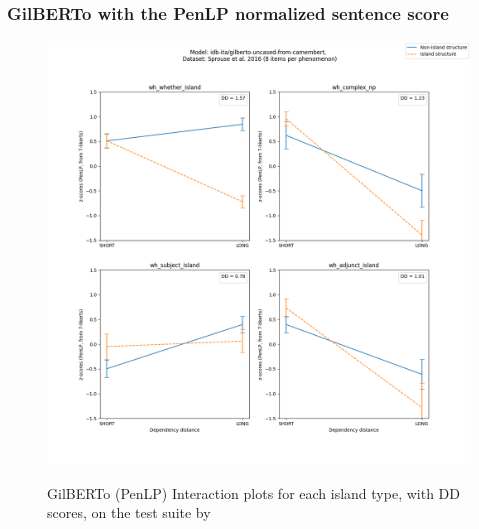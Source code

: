 \subsubsection{GilBERTo with the PenLP normalized sentence score}
\begin{figure}[h]
	\centering
	\includegraphics[width=1\textwidth]{images/AppendixA/Sprouse_wh_idb-ita_gilberto-uncased-from-camembert_PenLP-zscores-likert-2022-09-16_h10m00s24.png} 
	\label{A-fig:sprouse_gilberto_penlp}
	\caption{GilBERTo (PenLP) Interaction plots for each island type, with DD scores, on the test suite by \citet{sprouse2016experimental}}
\end{figure}
\clearpage
